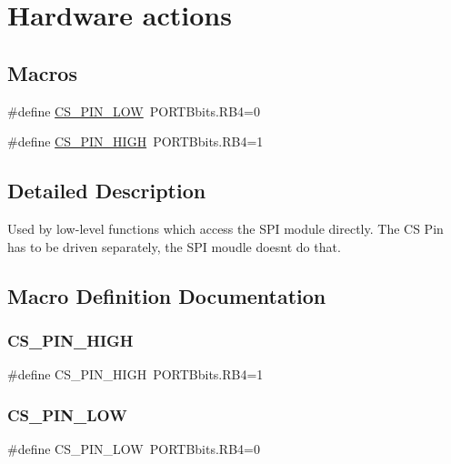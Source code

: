 \hypertarget{group___h_a_r_d_w_a_r_e___a_c_t_i_o_n_s}{}\section{Hardware actions}
\label{group___h_a_r_d_w_a_r_e___a_c_t_i_o_n_s}
\subsection*{Macros}
\begin{DoxyCompactItemize}
\item 
\#define \mbox{\hyperlink{group___h_a_r_d_w_a_r_e___a_c_t_i_o_n_s_ga86b6db148222b2e6c27f50ade652aed0}{C\+S\+\_\+\+P\+I\+N\+\_\+\+L\+OW}}~P\+O\+R\+T\+Bbits.\+R\+B4=0
\item 
\#define \mbox{\hyperlink{group___h_a_r_d_w_a_r_e___a_c_t_i_o_n_s_ga0113abc1907a59045f1cb1c5541f3aac}{C\+S\+\_\+\+P\+I\+N\+\_\+\+H\+I\+GH}}~P\+O\+R\+T\+Bbits.\+R\+B4=1
\end{DoxyCompactItemize}


\subsection{Detailed Description}
Used by low-\/level functions which access the S\+PI module directly. The CS Pin has to be driven separately, the S\+PI moudle doesn\textquotesingle{}t do that. 

\subsection{Macro Definition Documentation}
\mbox{\label{group___h_a_r_d_w_a_r_e___a_c_t_i_o_n_s_ga0113abc1907a59045f1cb1c5541f3aac}} 
\subsubsection{\texorpdfstring{CS\_PIN\_HIGH}{CS\_PIN\_HIGH}}
{\footnotesize\ttfamily \#define C\+S\+\_\+\+P\+I\+N\+\_\+\+H\+I\+GH~P\+O\+R\+T\+Bbits.\+R\+B4=1}

\mbox{\label{group___h_a_r_d_w_a_r_e___a_c_t_i_o_n_s_ga86b6db148222b2e6c27f50ade652aed0}} 
\subsubsection{\texorpdfstring{CS\_PIN\_LOW}{CS\_PIN\_LOW}}
{\footnotesize\ttfamily \#define C\+S\+\_\+\+P\+I\+N\+\_\+\+L\+OW~P\+O\+R\+T\+Bbits.\+R\+B4=0}

